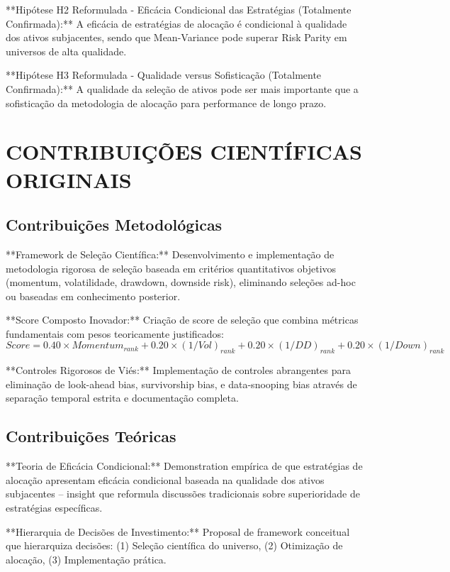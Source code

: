 **Hipótese H2 Reformulada - Eficácia Condicional das Estratégias (Totalmente Confirmada):** A eficácia de estratégias de alocação é condicional à qualidade dos ativos subjacentes, sendo que Mean-Variance pode superar Risk Parity em universos de alta qualidade.

**Hipótese H3 Reformulada - Qualidade versus Sofisticação (Totalmente Confirmada):** A qualidade da seleção de ativos pode ser mais importante que a sofisticação da metodologia de alocação para performance de longo prazo.

\section{CONTRIBUIÇÕES CIENTÍFICAS ORIGINAIS}

\subsection{Contribuições Metodológicas}

**Framework de Seleção Científica:** Desenvolvimento e implementação de metodologia rigorosa de seleção baseada em critérios quantitativos objetivos (momentum, volatilidade, drawdown, downside risk), eliminando seleções ad-hoc ou baseadas em conhecimento posterior.

**Score Composto Inovador:** Criação de score de seleção que combina métricas fundamentais com pesos teoricamente justificados:
\begin{equation}
Score = 0.40 \times Momentum_{rank} + 0.20 \times (1/Vol)_{rank} + 0.20 \times (1/DD)_{rank} + 0.20 \times (1/Down)_{rank}
\end{equation}

**Controles Rigorosos de Viés:** Implementação de controles abrangentes para eliminação de look-ahead bias, survivorship bias, e data-snooping bias através de separação temporal estrita e documentação completa.

\subsection{Contribuições Teóricas}

**Teoria de Eficácia Condicional:** Demonstration empírica de que estratégias de alocação apresentam eficácia condicional baseada na qualidade dos ativos subjacentes – insight que reformula discussões tradicionais sobre superioridade de estratégias específicas.

**Hierarquia de Decisões de Investimento:** Proposal de framework conceitual que hierarquiza decisões: (1) Seleção científica do universo, (2) Otimização de alocação, (3) Implementação prática.

